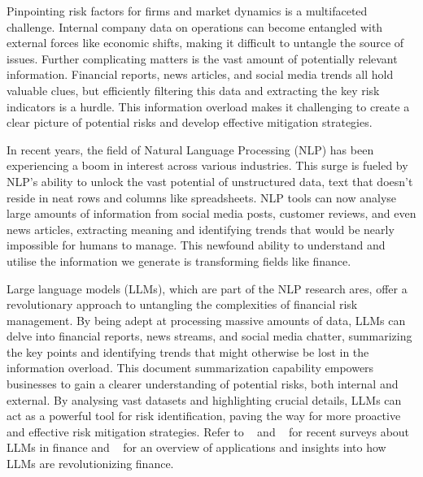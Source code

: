 %

Pinpointing risk factors for firms and market dynamics is a multifaceted challenge.
Internal company data on operations can become entangled with external forces like economic shifts, making it difficult
to untangle the source of issues.
Further complicating matters is the vast amount of potentially relevant information.
Financial reports, news articles, and social media trends all hold valuable clues, but efficiently filtering this data
and extracting the key risk indicators is a hurdle.
This information overload makes it challenging to create a clear picture of potential risks and develop effective
mitigation strategies.

In recent years, the field of Natural Language Processing (NLP) has been experiencing a boom in interest across various
industries.
This surge is fueled by NLP's ability to unlock the vast potential of unstructured data, text that doesn't reside in
neat rows and columns like spreadsheets.
NLP tools can now analyse large amounts of information from social media posts, customer reviews, and even news
articles, extracting meaning and identifying trends that would be nearly impossible for humans to manage.
This newfound ability to understand and utilise the information we generate is transforming fields like finance.

Large language models (LLMs), which are part of the NLP research ares, offer a revolutionary approach to untangling
the complexities of financial risk management.
By being adept at processing massive amounts of data, LLMs can delve into financial reports, news streams, and social
media chatter, summarizing the key points and identifying trends that might otherwise be lost in the information
overload.
This document summarization capability empowers businesses to gain a clearer understanding of potential risks, both
internal and external.
By analysing vast datasets and highlighting crucial details, LLMs can act as a powerful tool for risk identification,
paving the way for more proactive and effective risk mitigation strategies.
Refer to ~\cite{Lee2024} and ~\cite{Li2023} for recent surveys about LLMs in finance and ~\cite{Zhao2024} for an overview
of applications and insights into how LLMs are revolutionizing finance.

